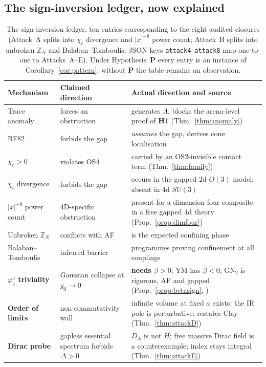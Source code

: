 \documentclass[11pt,a4paper]{article}
\theoremstyle{plain}
\theoremstyle{definition}
\theoremstyle{remark}
\newcommand{\Z}{\mathbb{Z}}\newcommand{\Spec}{\operatorname{Spec}}
\newcommand{\OS}{\mathrm{OS}}\newcommand{\Gap}{\mathrm{Gap}}
\newcommand{\Chit}{\chi_t}
\renewcommand{\_}{\oldunderscore\allowbreak}
\begin{document}
\subsection{The sign-inversion ledger, now explained}
\begin{table}[htbp]\centering\small
\renewcommand{\arraystretch}{1.22}
\begin{tabularx}{\textwidth}{p{3.3cm} p{3.2cm} X}
\toprule
\textbf{Mechanism} & \textbf{Claimed direction} & \textbf{Actual direction and source}\\
\midrule
Trace anomaly & forces an obstruction & generates $\Lambda$, blocks the arena-level proof of
\textbf{H1} (Thm.~\ref{thm:anomaly})\\
BF82 & forbids the gap & \emph{assumes} the gap, derives cone localisation \cite{BF1982}\\
$\Chit>0$ & violates $\OS4$ & carried by an $\OS2$-invisible contact term
(Thm.~\ref{thm:family})\\
$\Chit$ divergence & forbids the gap & occurs in the gapped $2$d $O(3)$ model; absent in $4$d
$SU(3)$ \cite{Bietenholz2018,Ce2015}\\
$|x|^{-8}$ power count & $4$D-specific obstruction & present for a dimension-four composite in a
free gapped $4$d theory (Prop.~\ref{prop:dimfour})\\
Unbroken $\Z_N$ & conflicts with AF & is the expected confining phase \cite{GKSW2015}\\
Balaban--Tomboulis & infrared barrier & programmes proving confinement at all couplings
\cite{Tomboulis1983,Tomboulis2007,Balaban1987}\\
\textbf{$\varphi^4_4$ triviality} & Gaussian collapse at $g_0\to0$ &
\textbf{needs $\beta>0$}; YM has $\beta<0$; GN$_2$ is rigorous, AF and gapped
(Prop.~\ref{prop:betasign}, \cite{FMRS1986})\\
\textbf{Order of limits} & non-commutativity wall & infinite volume at fixed $a$ exists;
the IR pole is perturbative; restates Clay (Thm.~\ref{thm:attackD})\\
\textbf{Dirac probe} & gapless essential spectrum forbids $\Delta>0$ &
$D_A$ is not $H$; free massive Dirac field is a counterexample; index stays integral
(Thm.~\ref{thm:attackE})\\
\bottomrule
\end{tabularx}
\caption{The sign-inversion ledger, ten entries corresponding to the eight audited closures (Attack~A splits into $\Chit$ divergence and $|x|^{-8}$ power count; Attack~B splits into unbroken $\Z_N$ and Balaban--Tomboulis; JSON keys \texttt{attack4}--\texttt{attack8} map one-to-one to Attacks~A--E). Under Hypothesis~\textbf{P} every entry is an instance of Corollary~\ref{cor:pattern}; without \textbf{P} the table remains an observation.}
\label{tab:signinversion}
\end{table}
\end{document}
